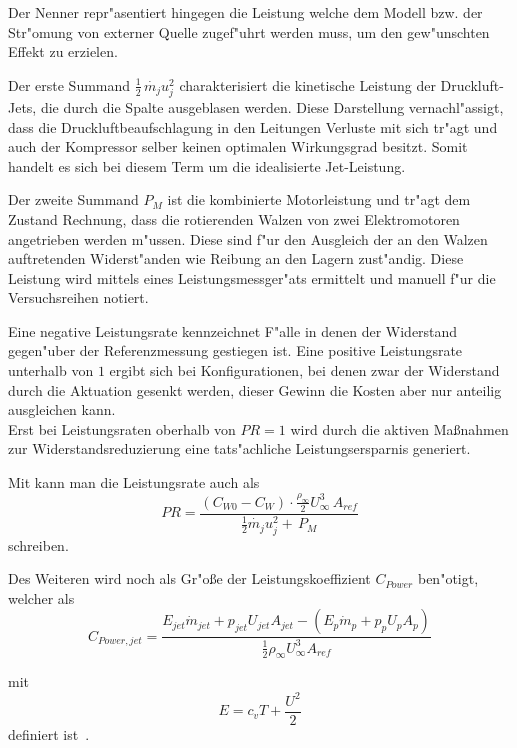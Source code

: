 Der Nenner repr"asentiert hingegen die Leistung welche dem Modell bzw. der Str"omung von externer Quelle zugef"uhrt werden muss, um den gew"unschten Effekt zu erzielen.

Der erste Summand $\frac{1}{2}\,\dot{m_j} u_j^2$ charakterisiert die kinetische Leistung der Druckluft-Jets, die durch die Spalte ausgeblasen werden. Diese Darstellung vernachl"assigt, dass die  Druckluftbeaufschlagung in den Leitungen Verluste mit sich tr"agt und auch der Kompressor selber keinen optimalen Wirkungsgrad besitzt. Somit handelt es sich bei diesem Term um die idealisierte Jet-Leistung.

Der zweite Summand $ P_M$ ist die kombinierte Motorleistung und tr"agt dem Zustand Rechnung, dass die rotierenden Walzen von zwei Elektromotoren angetrieben werden m"ussen. Diese sind f"ur den Ausgleich der an den Walzen auftretenden Widerst"anden wie Reibung an den Lagern zust"andig.
Diese Leistung wird mittels eines Leistungsmessger"ats ermittelt und manuell f"ur die Versuchsreihen notiert.

Eine negative Leistungsrate kennzeichnet F"alle in denen der Widerstand gegen"uber der Referenzmessung gestiegen ist. Eine positive Leistungsrate unterhalb von $1$ ergibt sich bei Konfigurationen, bei denen zwar der Widerstand durch die Aktuation gesenkt werden, dieser Gewinn die Kosten aber nur anteilig ausgleichen kann.\\
Erst bei Leistungsraten oberhalb von $PR = 1$ wird durch die aktiven Ma\ss{}nahmen zur Widerstandsreduzierung eine tats"achliche Leistungsersparnis generiert.

Mit  kann man die Leistungsrate auch als
\begin{equation}
	\label{eq:leistungsrate_cw}
	PR = \frac{(C_{W0} - C_W)\cdot \frac{\rho_{\infty}}{2} U^3_{\infty}\,A_{ref}}{\frac{1}{2} \dot{m_j} u_j^2 + \, P_M}
\end{equation}
schreiben.

Des Weiteren wird noch als Gr"o\ss{}e der Leistungskoeffizient $C_{Power}$ ben"otigt, welcher als
\begin{equation}
	\label{eq:def-powercoefficient}
	C_{Power,jet} = \frac{E_{jet}\dot{m}_{jet} + p_{jet}U_{jet}A_{jet} - (E_p\dot{m}_p + p_p U_p A_p)}{\frac{1}{2}\rho_{\infty}U^3_{\infty} A_{ref}}
\end{equation}

mit
\begin{equation}
	\label{eq:def-energieterm}
	E = c_vT + \frac{U^2}{2}
\end{equation}		
definiert ist~\cite{Hucho.2011}.

